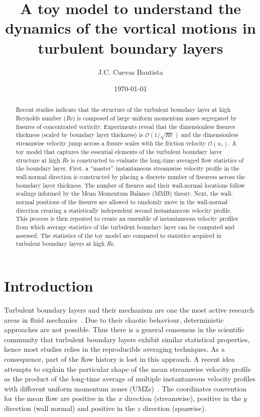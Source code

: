 \documentclass[aps,reprint,amsmath,amssymb,pra]{revtex4-1}%
\begin{document}
\title{A toy model to understand the dynamics of the vortical motions in turbulent boundary layers}
\author{J.C. Cuevas Bautista}
\date{\today}
\begin{abstract}
\noindent 
Recent studies indicate that the structure of the turbulent boundary layer at high Reynolds number (\textit{Re}) is composed of large uniform momentum zones segregated by fissures of concentrated vorticity. Experiments reveal that the dimensionless fissures thickness (scaled by boundary layer thickness) is $\mathcal{O}(1/\sqrt{Re})$ and the dimensionless streamwise velocity jump across a fissure scales with the friction velocity $\mathcal{O}(u_{\tau})$. A toy model that captures the essential elements of the turbulent boundary layer structure at high \textit{Re} is constructed to evaluate the long-time averaged flow statistics of the boundary layer. First, a ``master'' instantaneous  streamwise velocity profile in the wall-normal direction is constructed by placing a discrete number of fissuress across the boundary layer thickness. The number of fissures and their wall-normal locations follow scalings informed by the Mean Momentum Balance (MMB) theory. Next, the wall-normal positions of the fissures are allowed to randomly move in the wall-normal direction creating a statistically independent second instantaneous velocity profile. This process is then repeated to create an ensemble of instantaneous velocity profiles from which average statistics of the turbulent boundary layer can be computed and assessed. The statistics of the toy model are compared to statistics acquired in turbulent boundary layers at high \textit{Re}.
\end{abstract}
\maketitle
\section{\label{sec:intro} Introduction}
Turbulent boundary layers and their mechanism are one the most active research areas in fluid mechanics~\citep{kline1967,head1981,heist2000}. Due to their chaotic behaviour, deterministic approaches are not possible. Thus there is a general consensus in the scientific community that turbulent boundary layers exhibit similar statistical properties, hence most studies relies in the reproducible averaging techniques.  As a consequence, part of the flow history is lost in this approach. A recent idea attempts to explain the particular shape of the mean streamwise velocity profile as the product of the long-time average of multiple instantaneous velocity profiles with different uniform momentum zones (UMZs)~\citep{mca1995,umz2015}. The coordinates convention for the mean flow are positive in the $x$ direction (streamwise), positive in the $y$ direction (wall normal) and  positive in the $z$ direction (spanwise). 
\end{document}
